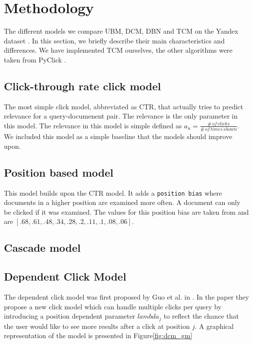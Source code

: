 \section{Methodology}
\label{sec:methodology}
The different models we compare UBM, DCM, DBN and TCM on the Yandex dataset \cite{yandex}. In this section, we briefly describe their main characteristics and differences. We have implemented TCM ourselves, the other algorithms were taken from PyClick \cite{PyClick}.

\subsection{Click-through rate click model}
The most simple click model, abbreviated as CTR, that actually tries to predict relevance for a query-documenent pair. The relevance is the only parameter in this model. The relevance in this model is simple defined as $a_u = \frac{\#\,of\,clicks}{\#\,of\,times\,shown}$. We included this model as a simple baseline that the models should improve upon.

\subsection{Position based model}
This model builds upon the CTR model. It adds a \texttt{position bias} where documents in a higher position are examined more often. A document can only be clicked if it was examined. The values for this position bias are taken from \cite{eye_track} and are $[.68, .61, .48, .34, .28, .2, .11, .1, .08, .06]$.

\subsection{Cascade model}

\subsection{Dependent Click Model}
The dependent click model was first proposed by Guo et al. in \cite{Guo2009}. In the paper they propose a new click model which can handle multiple clicks per query by introducing a position dependent parameter $lambda_j$ to reflect the chance that the user would like to see more results after a click at position $j$. A graphical representation of the model is presented in Figure\ref{fig:dcm_gm} 

